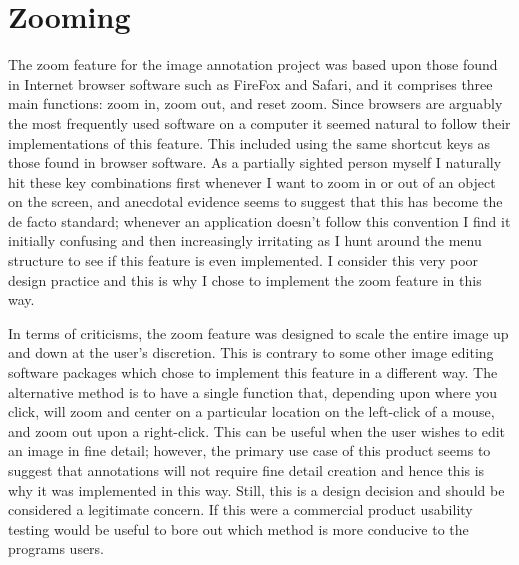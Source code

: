 \section{Zooming}
The zoom feature for the image annotation project was based upon those found in Internet browser software such as FireFox and Safari, and it comprises three main functions: zoom in, zoom out, and reset zoom.  Since browsers are arguably the most frequently used software on a computer it seemed natural to follow their implementations of this feature.  This included using the same shortcut keys as those found in browser software.  As a partially sighted person myself I naturally hit these key combinations first whenever I want to zoom in or out of an object on the screen, and anecdotal evidence seems to suggest that this has become the de facto standard; whenever an application doesn’t follow this convention I find it initially confusing and then increasingly irritating as I hunt around the menu structure to see if this feature is even implemented.  I consider this very poor design practice and this is why I chose to implement the zoom feature in this way.

In terms of criticisms, the zoom feature was designed to scale the entire image up and down at the user’s discretion.  This is contrary to some other image editing software packages which chose to implement this feature in a different way.  The alternative method is to have a single function that, depending upon where you click, will zoom and center on a particular location on the left-click of a mouse, and zoom out upon a right-click.  This can be useful when the user wishes to edit an image in fine detail; however, the primary use case of this product seems to suggest that annotations will not require fine detail creation and hence this is why it was implemented in this way.  Still, this is a design decision and should be considered a legitimate concern.  If this were a commercial product usability testing would be useful to bore out which method is more conducive to the programs users.